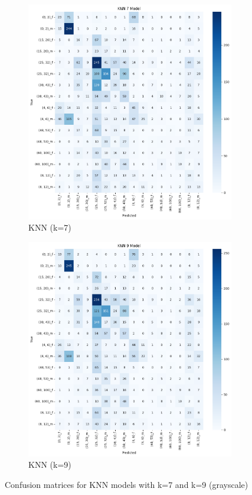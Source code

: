 \documentclass{article}
\begin{document}
\begin{figure}[H]
    \centering
    \begin{subfigure}[b]{0.48\textwidth}
        \includegraphics[width=\textwidth]{assets/confusion_matrix/grayscale/KNN7.png}
        \caption{KNN (k=7)}
    \end{subfigure}
    \hfill
    \begin{subfigure}[b]{0.48\textwidth}
        \includegraphics[width=\textwidth]{assets/confusion_matrix/grayscale/KNN9.png}
        \caption{KNN (k=9)}
    \end{subfigure}
    \caption{Confusion matrices for KNN models with k=7 and k=9 (grayscale)}
    \label{fig:grayscale_confusion_matrices_4}
\end{figure}
\end{document}
